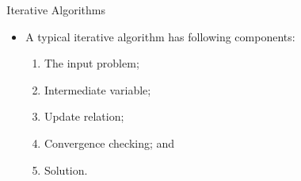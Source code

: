 \begin{columns}
\begin{column}{0.4\textwidth}

\end{column}
\begin{column}{0.6\textwidth}
\begin{block}{Iterative Algorithms}
\begin{itemize}
\item A typical iterative algorithm has following components:
\begin{enumerate}
\item The input problem;
\item Intermediate variable; 
\item Update relation; 
\item Convergence checking; and 
\item Solution. 
\end{enumerate}
\end{itemize}
\end{block}
\end{column}


\end{columns}
